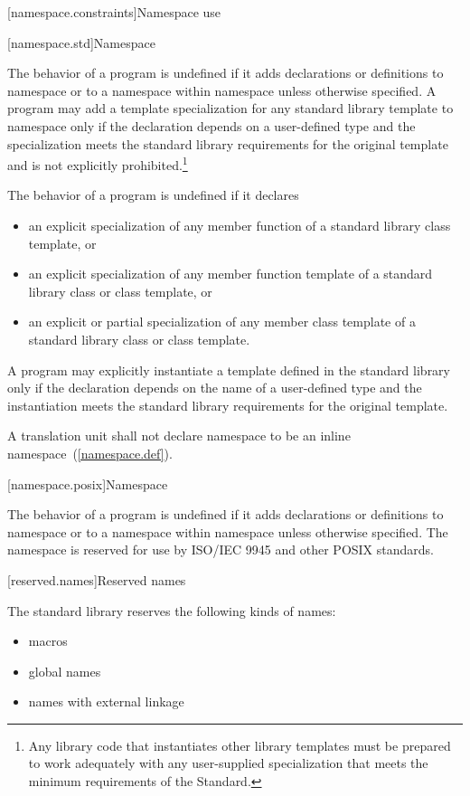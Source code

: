 [namespace.constraints]{Namespace use}

[namespace.std]{Namespace }

\pnum
The behavior of a \Cpp program is undefined if it adds declarations or definitions to namespace
or to a namespace within namespace
unless otherwise specified.
A program may add a template specialization for any standard library template
to namespace
 only if the declaration
depends on a user-defined type
and the specialization meets the standard library requirements
for the original template and is not explicitly prohibited.\footnote{Any
library code that instantiates other library templates
must be prepared to work adequately with any user-supplied specialization
that meets the minimum requirements of the Standard.}

\pnum
The behavior of a \Cpp program is undefined if it declares
\begin{itemize}
\item an explicit specialization of any member function of a standard
library class template, or

\item an explicit specialization of any member function template of a
standard library class or class template, or

\item an explicit or partial specialization of any member class template
of a standard library class or class template.
\end{itemize}
A program may explicitly instantiate a template defined in the standard library
only if the declaration depends on the name of a user-defined type
and the instantiation meets the standard library requirements for the
original template.

\pnum
A translation unit shall not declare namespace  to be an inline namespace~(\ref{namespace.def}).

[namespace.posix]{Namespace }

\pnum
The behavior of a \Cpp program is undefined if it adds declarations or definitions to namespace
or to a namespace within namespace
unless otherwise specified. The namespace  is reserved for use by
ISO/IEC 9945 and other POSIX standards.

[reserved.names]{Reserved names}%

\pnum
The \Cpp standard library reserves the following kinds of names:
\begin{itemize}
\item macros
\item global names
\item names with external linkage
\end{itemize}

